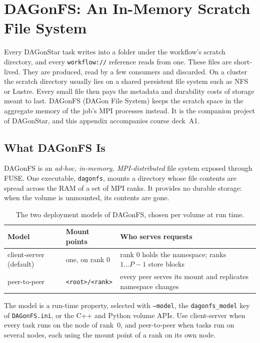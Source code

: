 \chapter{DAGonFS: An In-Memory Scratch File System}
\label{app:dagonfs}

Every DAGonStar task writes into a folder under the workflow's scratch
directory, and every \texttt{workflow://} reference reads from one. These
files are short-lived. They are produced, read by a few consumers and
discarded. On a cluster the scratch directory usually lies on a shared
persistent file system such as NFS or Lustre. Every small file then pays the
metadata and durability costs of storage meant to last. DAGonFS (DAGon File
System) keeps the scratch space in the aggregate memory of the job's MPI
processes instead. It is the companion project of DAGonStar, and this
appendix accompanies course deck~A1.

\section{What DAGonFS Is}

DAGonFS is an \emph{ad-hoc, in-memory, MPI-distributed} file system exposed
through FUSE. One executable, \texttt{dagonfs}, mounts a directory whose file
contents are spread across the RAM of a set of MPI ranks. It provides no
durable storage: when the volume is unmounted, its contents are gone.

\begin{table}[h]
\centering
\begin{tabular}{@{}lll@{}}
\toprule
Model & Mount points & Who serves requests \\
\midrule
client-server (default) & one, on rank 0 & rank 0 holds the namespace;
  ranks $1\ldots P-1$ store blocks \\
peer-to-peer & \texttt{<root>/<rank>} & every peer serves its mount and
  replicates namespace changes \\
\bottomrule
\end{tabular}
\caption{The two deployment models of DAGonFS, chosen per volume at run time.}
\label{tab:dagonfs-models}
\end{table}

The model is a run-time property, selected with \texttt{--model}, the
\texttt{dagonfs\_model} key of \texttt{DAGonFS.ini}, or the C++ and Python
volume APIs. Use client-server when every task runs on the node of rank~0,
and peer-to-peer when tasks run on several nodes, each using the mount point
of a rank on its own node.

